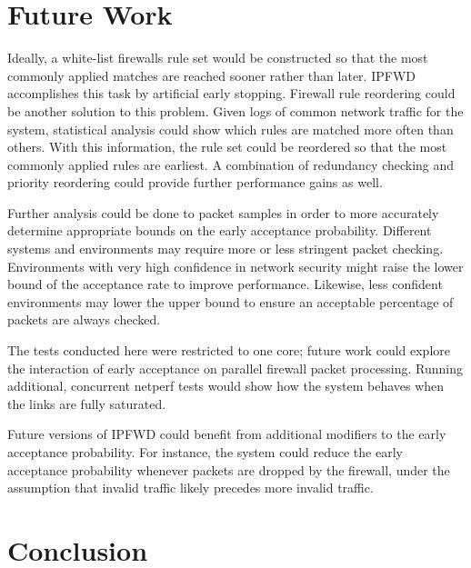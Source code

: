 \documentclass[journal]{IEEEtran}
\begin{document}
\section{Future Work}

  Ideally, a white-list firewalls rule set would be constructed so that the
  most commonly applied matches are reached sooner rather than later. IPFWD
  accomplishes this task by artificial early stopping. Firewall rule reordering
  could be another solution to this problem. Given logs of common network
  traffic for the system, statistical analysis could show which rules are
  matched more often than others. With this information, the rule set could be
  reordered so that the most commonly applied rules are earliest. A combination
  of redundancy checking and priority reordering could provide further
  performance gains as well.

  Further analysis could be done to packet samples in order to more accurately
  determine appropriate bounds on the early acceptance probability. Different
  systems and environments may require more or less stringent packet checking.
  Environments with very high confidence in network security might raise the
  lower bound of the acceptance rate to improve performance. Likewise, less
  confident environments may lower the upper bound to ensure an acceptable
  percentage of packets are always checked.

  The tests conducted here were restricted to one core; future work could
  explore the interaction of early acceptance on parallel firewall packet
  processing. Running additional, concurrent netperf tests would show how the
  system behaves when the links are fully saturated.

  Future versions of IPFWD could benefit from additional modifiers to the early
  acceptance probability. For instance, the system could reduce the early
  acceptance probability whenever packets are dropped by the firewall, under
  the assumption that invalid traffic likely precedes more invalid traffic.


\section{Conclusion}
\end{document}
